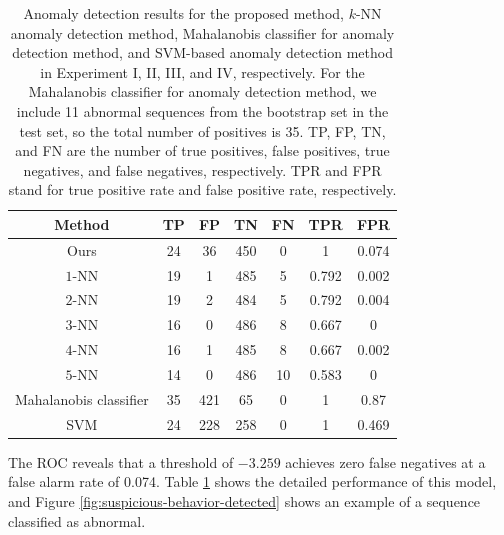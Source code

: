 \begin{table}[t]
  \caption[Anomaly detection results for the proposed method, $k$-NN
    anomaly detection method, Mahalanobis classifier for anomaly detection method, and
    SVM-based anomaly detection method in Experiment I, II, III, and
    IV, respectively.]{\small Anomaly detection results for the
    proposed method, $k$-NN anomaly detection method, Mahalanobis classifier for 
    anomaly detection method, and SVM-based anomaly detection method
    in Experiment I, II, III, and IV, respectively. For the Mahalanobis classifier for 
    anomaly detection method, we include 11 abnormal sequences from
    the bootstrap set in the test set, so the total number of
    positives is 35. TP, FP, TN, and FN are the number of true positives, 
    false positives, true negatives, and false negatives, respectively. 
    TPR and FPR stand for true positive rate and false positive rate, 
    respectively.}
  \begin{center}
    \begin{tabular}{c|c|c|c|c|c|c}
      \hline
      Method & TP & FP & TN & FN & TPR & FPR \\
      \hline\hline
      Ours & 24 & 36 & 450 & 0 & 1 & 0.074 \\ \hline
      $1$-NN & 19 & 1 & 485 & 5 & 0.792 & 0.002 \\ \hline
      $2$-NN & 19 & 2 & 484 & 5 & 0.792 & 0.004 \\ \hline
      $3$-NN & 16 & 0 & 486 & 8 & 0.667 & 0 \\ \hline
      $4$-NN & 16 & 1 & 485 & 8 & 0.667 & 0.002 \\ \hline
      $5$-NN & 14 & 0 & 486 & 10 & 0.583 & 0 \\ \hline
      Mahalanobis classifier & 35 & 421 & 65 & 0 & 1 & 0.87 \\ \hline
      SVM & 24 & 228 & 258 & 0 & 1 & 0.469 \\ \hline
    \end{tabular}
  \end{center}
  \label{tab:batch-detection-results}
\end{table}

The ROC reveals that a threshold of $-3.259$ achieves zero false
negatives at a false alarm rate of 0.074.
Table \ref{tab:batch-detection-results} shows the detailed performance
of this model, and Figure \ref{fig:suspicious-behavior-detected}
shows an example of a sequence classified as abnormal. 

